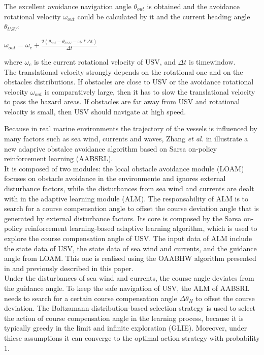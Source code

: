 \documentclass[12pt]{article}
\begin{document}
              The excellent avoidance navigation angle $\theta_{out}$ is obtained and the avoidance rotational velocity $\omega_{out}$ could be calculated by it and the current heading angle $\theta_{USV}$:
                  \begin{center}
                        $\omega_{out} = \omega_c + \frac{2(\theta_{out} - \theta_{USV} -\omega_c * \Delta t)}{\Delta t}$
                  \end{center}
              where $\omega_c$ is the current rotational velocity of USV, and $\Delta t$ is time\-window.\\
              The translational velocity strongly depends on the rotational one and on the obstacles distributions. If obstacles are close to USV or the avoidance rotational velocity $\omega_{out}$ is comparatively large, then it has to slow the translational velocity to pass the hazard areas. If obstacles are far away from USV and rotational velocity is small, then USV should navigate at high speed.

              \indent Because in real marine environments the trajectory of the vessels is influenced by many factors such as sea wind, currents and waves, Zhang \textit{et al.} in \parencite{Zhang2014} illustrate a new adaprive obstalce avoidance algorithm based on Sarsa on-policy reinforcement learning (AABSRL).\\
              It is composed of two modules: the local obstacle avoidance module (LOAM) focuses on obstacle avoidance in the environmente and ignores external disturbance factors, while the disturbances from sea wind and currents are dealt with in the adaptive learning module (ALM). The responsability of ALM is to search for a course compensation angle to offset the course deviation angle that is generated by external disturbance factors. Its core is composed by the Sarsa on-policy reinforcement learning-based adaptive learning algorithm, which is used to explore the course compensation angle of USV. The input data of ALM include the state data of USV, the state data of sea wind and currents, and the guidance angle from LOAM. This one is realised using the OAABHW algorithm presented in \parencite{Tang2012} and previously described in this paper.\\
              Under the disturbances of sea wind and currents, the course angle deviates from the guidance angle. To keep the safe navigation of USV, the ALM of AABSRL needs to search for a certain course compensation angle $\Delta \theta_H $ to offset the course deviation. The Boltzamann distribution-based selection strategy is used to select the action of course compensation angle in the learning process, because it is typically greedy in the limit and infinite exploration (GLIE). Moreover, under thiese assumptions it can converge to the optimal action strategy with probability 1.
\end{document}
